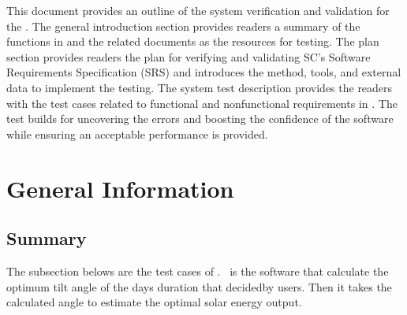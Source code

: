 \documentclass[12pt, titlepage]{article}
\begin{document}



\newpage


This document provides an outline of the system verification and validation for
the \progname. The general introduction section provides readers a summary of
the functions in \progname{} and the related documents as the resources for
testing. The plan section provides readers the plan for verifying and
validating SC's Software Requirements Specification (SRS) and introduces the
method, tools, and external data to implement the testing. The system test
description
provides the readers with the test cases related to functional and nonfunctional
requirements in \progname. The test builds for uncovering the errors and
boosting the confidence of the software while ensuring an acceptable
performance is provided. 



\section{General Information}


\subsection{Summary}

The subsection belows are the test cases of \progname. \progname ~is the
software that calculate the optimum tilt angle of the days duration that
decidedby users. Then it takes the calculated angle to estimate the optimal
solar energy output.

\end{document}
